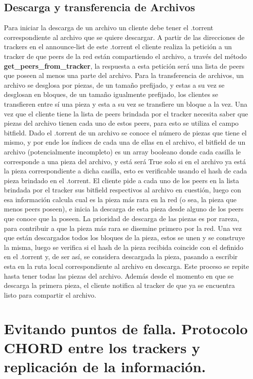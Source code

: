 \documentclass[article]{llncs}
\begin{document}
\subsection{Descarga y transferencia de Archivos}
Para iniciar la descarga de un archivo un cliente debe tener el .torrent correspondiente al archivo que se quiere descargar. A partir de 
las direcciones de trackers en el announce-list de este .torrent el cliente realiza la petición a un tracker de que peers de la red 
están compartiendo el archivo, a través del método \textbf{get_peers_from_tracker}, la respuesta a esta petición será una lista de 
peers que poseen al menos una parte del archivo. Para la transferencia de archivos, un archivo se desglosa por piezas, de un tamaño 
prefijado, y estas a su vez se desglosan en bloques, de un tamaño igualmente prefijado, los clientes se transfieren entre sí una pieza y esta 
a su vez se transfiere un bloque a la vez. Una vez que el cliente tiene la lista de peers brindada por el tracker necesita saber que piezas del archivo 
tienen cada uno de estos peers, para esto se utiliza el campo bitfield. Dado el .torrent de un archivo se conoce el número de piezas que tiene el mismo, 
y por ende los índices de cada una de ellas en el archivo, el bitfield de un archivo (potencialmente incompleto) es un array booleano donde cada 
casilla le corresponde a una pieza del archivo, y está será True solo si en el archivo ya está la pieza correspondiente a dicha casilla, esto es 
verificable usando el hash de cada pieza brindado en el .torrent. El cliente pide a cada uno de los peers en la lista brindada por el 
tracker sus bitfield respectivos al archivo en cuestión, luego con esa información calcula cual es la pieza más rara en la red (o sea, la pieza que 
menos peers poseen), e inicia la descarga de esta pieza desde alguno de los peers que conoce que la poseen. La prioridad de descarga de las piezas es 
por rareza, para contribuir a que la pieza más rara se disemine primero por la red. Una vez que están descargados todos los bloques 
de la pieza, estos se unen y se construye la misma, luego se verifica si el hash de la pieza recibida coincide con el definido en el .torrent y, 
de ser así, se considera descargada la pieza, pasando a escribir esta en la ruta local correspondiente al archivo en descarga. Este proceso se repite hasta 
tener todas las piezas del archivo. Además desde el momento en que se descarga la primera pieza, el cliente notifica al tracker de que ya se encuentra listo para 
compartir el archivo.


\section{Evitando puntos de falla. Protocolo CHORD entre los trackers y replicación de la información.}
\end{document}
